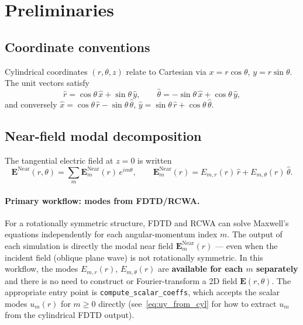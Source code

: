 \documentclass[11pt,a4paper]{article}
\newcommand{\rhat}{\hat{r}}
\newcommand{\that}{\hat{\theta}}
\newcommand{\xhat}{\hat{x}}
\newcommand{\yhat}{\hat{y}}
\newcommand{\E}{\mathbf{E}}
\begin{document}
\section{Preliminaries}
\label{sec:prelim}

\subsection{Coordinate conventions}

Cylindrical coordinates $(r,\theta,z)$ relate to Cartesian via
$x = r\cos\theta$, $y = r\sin\theta$.
The unit vectors satisfy
\begin{equation}
  \rhat = \cos\theta\,\xhat + \sin\theta\,\yhat,\qquad
  \that = -\sin\theta\,\xhat + \cos\theta\,\yhat,
\end{equation}
and conversely $\xhat = \cos\theta\,\rhat - \sin\theta\,\that$,\;
$\yhat = \sin\theta\,\rhat + \cos\theta\,\that$.

\subsection{Near-field modal decomposition}

The tangential electric field at $z=0$ is written
\begin{equation}\label{eq:nearfield}
  \E^{\mathrm{Near}}(r,\theta)
  = \sum_m \E^{\mathrm{Near}}_m(r)\,e^{im\theta},
  \qquad
  \E^{\mathrm{Near}}_m(r) = E_{m,r}(r)\,\rhat + E_{m,\theta}(r)\,\that.
\end{equation}

\paragraph{Primary workflow: modes from FDTD/RCWA.}
For a rotationally symmetric structure, FDTD and RCWA can solve Maxwell's equations
independently for each angular-momentum index $m$.  The output of each simulation is
directly the modal near field $\E^{\mathrm{Near}}_m(r)$ --- even when the incident
field (oblique plane wave) is not rotationally symmetric.  In this workflow, the
modes $E_{m,r}(r)$, $E_{m,\theta}(r)$ are \textbf{available for each $m$ separately}
and there is no need to construct or Fourier-transform a 2D field $\E(r,\theta)$.
The appropriate entry point is \texttt{compute\_scalar\_coeffs}, which accepts
the scalar modes $u_m(r)$ for $m \ge 0$ directly (see~\eqref{eq:uy_from_cyl}
for how to extract $u_m$ from the cylindrical FDTD output).
\end{document}
